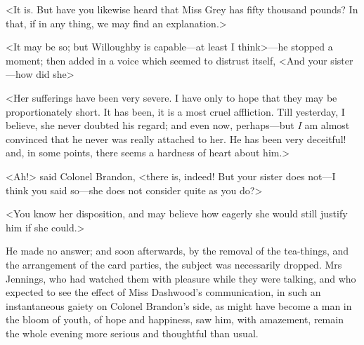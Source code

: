 <It is. But have you likewise heard that Miss Grey has fifty thousand pounds? In that, if in any thing, we may find an explanation.>

<It may be so; but Willoughby is capable—at least I think>—he stopped a moment; then added in a voice which seemed to distrust itself, <And your sister—how did she\longdash>

<Her sufferings have been very severe. I have only to hope that they may be proportionately short. It has been, it is a most cruel affliction. Till yesterday, I believe, she never doubted his regard; and even now, perhaps—but \textit{I} am almost convinced that he never was really attached to her. He has been very deceitful! and, in some points, there seems a hardness of heart about him.>

<Ah!> said Colonel Brandon, <there is, indeed! But your sister does not—I think you said so—she does not consider quite as you do?>

<You know her disposition, and may believe how eagerly she would still justify him if she could.>

He made no answer; and soon afterwards, by the removal of the tea-things, and the arrangement of the card parties, the subject was necessarily dropped. Mrs Jennings, who had watched them with pleasure while they were talking, and who expected to see the effect of Miss Dashwood's communication, in such an instantaneous gaiety on Colonel Brandon's side, as might have become a man in the bloom of youth, of hope and happiness, saw him, with amazement, remain the whole evening more serious and thoughtful than usual.